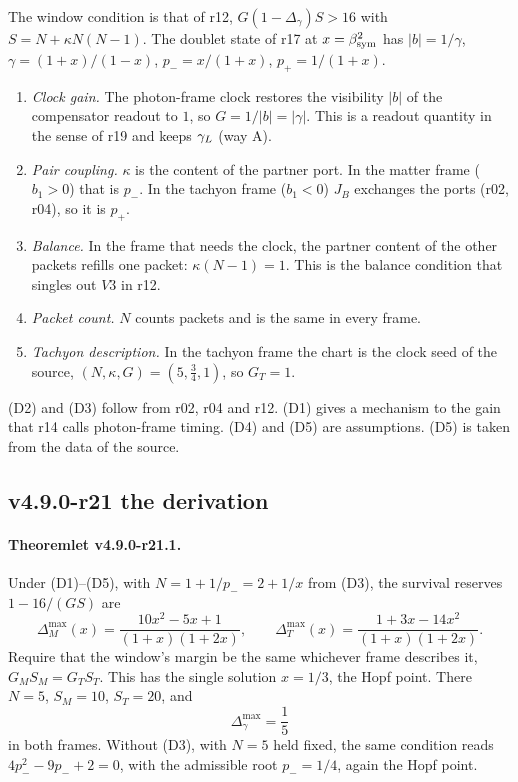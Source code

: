 The window condition is that of r12, \(G(1-\Delta_\gamma)S>16\) with \(S=N+\kappa N(N-1)\).  The doublet state of r17 at
\(x=\beta_{\mathrm{sym}}^2\) has \(|b|=1/\gamma\), \(\gamma=(1+x)/(1-x)\), \(p_-=x/(1+x)\), \(p_+=1/(1+x)\).
\begin{enumerate}[leftmargin=2em]
\item[(D1)] \emph{Clock gain.}  The photon-frame clock restores the visibility \(|b|\) of the compensator readout to \(1\), so
\(G=1/|b|=|\gamma|\).  This is a readout quantity in the sense of r19 and keeps \(\gamma_L\) (way A).
\item[(D2)] \emph{Pair coupling.}  \(\kappa\) is the content of the partner port.  In the matter frame (\(b_1>0\)) that is \(p_-\).  In
the tachyon frame (\(b_1<0\)) \(J_B\) exchanges the ports (r02, r04), so it is \(p_+\).
\item[(D3)] \emph{Balance.}  In the frame that needs the clock, the partner content of the other packets refills one packet:
\(\kappa(N-1)=1\).  This is the balance condition that singles out \(V3\) in r12.
\item[(D4)] \emph{Packet count.}  \(N\) counts packets and is the same in every frame.
\item[(D5)] \emph{Tachyon description.}  In the tachyon frame the chart is the clock seed of the source,
\((N,\kappa,G)=(5,\tfrac34,1)\), so \(G_T=1\).
\end{enumerate}
(D2) and (D3) follow from r02, r04 and r12.  (D1) gives a mechanism to the gain that r14 calls photon-frame timing.  (D4) and
(D5) are assumptions.  (D5) is taken from the data of the source.

\subsection*{v4.9.0-r21 the derivation}
\label{subsec:v490-r21-derivation}

\paragraph{Theoremlet v4.9.0-r21.1.}
Under (D1)--(D5), with \(N=1+1/p_-=2+1/x\) from (D3), the survival reserves \(1-16/(GS)\) are
\[
\Delta_M^{\max}(x)=\frac{10x^2-5x+1}{(1+x)(1+2x)},\qquad
\Delta_T^{\max}(x)=\frac{1+3x-14x^2}{(1+x)(1+2x)} .
\]
Require that the window's margin be the same whichever frame describes it, \(G_MS_M=G_TS_T\).  This has the single solution
\(x=1/3\), the Hopf point.  There \(N=5\), \(S_M=10\), \(S_T=20\), and
\[
\Delta_\gamma^{\max}=\frac15
\]
in both frames.  Without (D3), with \(N=5\) held fixed, the same condition reads \(4p_-^2-9p_-+2=0\), with the admissible root
\(p_-=1/4\), again the Hopf point.

